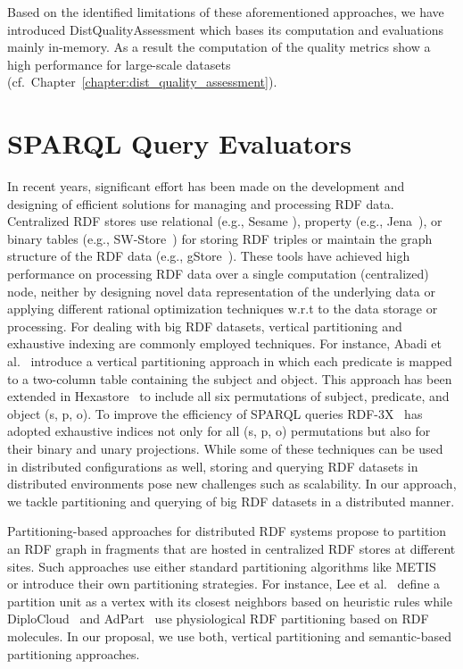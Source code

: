 Based on the identified limitations of these aforementioned approaches, we have introduced DistQualityAssessment which bases its computation and evaluations mainly in-memory.
As a result the computation of the quality metrics show a high performance for large-scale datasets (cf.\ Chapter~\ref{chapter:dist_quality_assessment}).

\section{SPARQL Query Evaluators}

In recent years, significant effort has been made on the development and designing of efficient solutions for managing and processing \gls{RDF} data.
Centralized \gls{RDF} stores use relational (e.g., Sesame \cite{BroekstraKH02}), property (e.g., Jena~\cite{Wilkinson06}), or binary tables (e.g., SW-Store~\cite{AbadiMMH09}) for storing \gls{RDF} triples or maintain the graph structure of the \gls{RDF} data (e.g., gStore~\cite{ZouMCOZ11}).
These tools have achieved high performance on processing \gls{RDF} data over a single computation (centralized) node, neither by designing novel data representation of the underlying data or applying different rational optimization techniques w.r.t to the data storage or processing.
For dealing with big \gls{RDF} datasets, vertical partitioning and exhaustive indexing are commonly employed techniques. 
For instance, Abadi et al.~\cite{AbadiMMH07} introduce a vertical partitioning approach in which each predicate is mapped to a two-column table containing the subject and object. 
This approach has been extended in Hexastore~\cite{WeissKB08} to include all six permutations of subject, predicate, and object (s, p, o). 
To improve the efficiency of \gls{SPARQL} queries RDF-3X~\cite{NeumannW10} has adopted exhaustive indices not only for all (s, p, o) permutations but also for their binary and unary projections. 
While some of these techniques can be used in distributed configurations as well, storing and querying \gls{RDF} datasets in distributed environments pose new challenges such as scalability. 
In our approach, we tackle partitioning and querying of big \gls{RDF} datasets in a distributed manner.

Partitioning-based approaches for distributed \gls{RDF} systems propose to partition an \gls{RDF} graph in fragments that are hosted in centralized \gls{RDF} stores at different sites. 
Such approaches use either standard partitioning algorithms like METIS~\cite{GurajadaSMT14} or introduce their own partitioning strategies. 
For instance, Lee et al.~\cite{LeeL2013} define a partition unit as a vertex with its closest neighbors based on heuristic rules while DiploCloud~\cite{WylotC16} and AdPart~\cite{harbi2016accelerating} use physiological \gls{RDF} partitioning based on \gls{RDF} molecules. 
In our proposal, we use both, vertical partitioning and semantic-based partitioning approaches.

